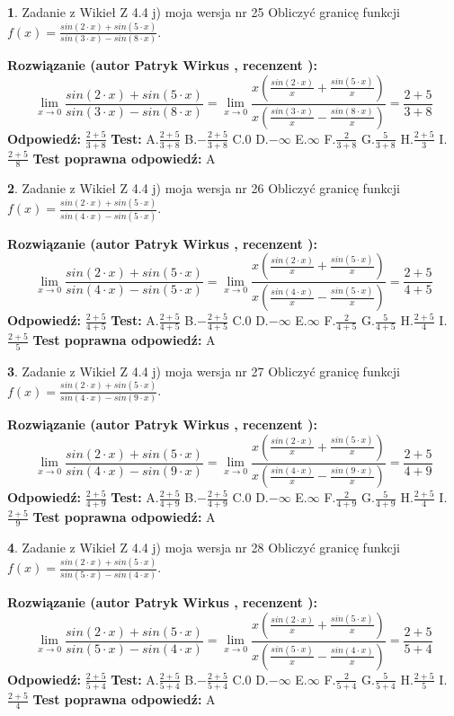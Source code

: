 \documentclass[12pt, a4paper]{article}
\theoremstyle{definition} %
\newtheorem{zad}{}
\newcommand{\zadStart}[1]{\begin{zad}#1\newline}
\newcommand{\zadStop}{\end{zad}}
\newcommand{\rozwStart}[2]{\noindent \textbf{Rozwiązanie (autor #1 , recenzent #2): }\newline}
\newcommand{\rozwStop}{\newline}
\newcommand{\odpStart}{\noindent \textbf{Odpowiedź:}\newline}
\newcommand{\odpStop}{\newline}
\newcommand{\testStart}{\noindent \textbf{Test:}\newline}
\newcommand{\testStop}{\newline}
\newcommand{\kluczStart}{\noindent \textbf{Test poprawna odpowiedź:}\newline}
\newcommand{\kluczStop}{\newline}
\begin{document}
\zadStart{Zadanie z Wikieł Z 4.4 j) moja wersja nr 25}
Obliczyć granicę funkcji $f(x)=\frac{sin(2\cdot x) +sin(5\cdot x)}{sin(3\cdot x) -sin(8\cdot x)}$.
\zadStop
\rozwStart{Patryk Wirkus}{}
$$\lim\limits_{x\to 0}\frac{sin(2\cdot x) +sin(5\cdot x)}{sin(3\cdot x) -sin(8\cdot x)}=\lim\limits_{x\to 0}\frac{x(\frac{sin(2\cdot x)}{x}+\frac{sin(5\cdot x)}{x})}{x(\frac{sin(3\cdot x)}{x}-\frac{sin(8\cdot x)}{x})}=\frac{2+5}{3+8}$$
\rozwStop
\odpStart
$\frac{2+5}{3+8}$
\odpStop
\testStart
A.$\frac{2+5}{3+8}$
B.$-\frac{2+5}{3+8}$
C.$0$
D.$-\infty$
E.$\infty$
F.$\frac{2}{3+8}$
G.$\frac{5}{3+8}$
H.$\frac{2+5}{3}$
I.$\frac{2+5}{8}$
\testStop
\kluczStart
A
\kluczStop



\zadStart{Zadanie z Wikieł Z 4.4 j) moja wersja nr 26}
Obliczyć granicę funkcji $f(x)=\frac{sin(2\cdot x) +sin(5\cdot x)}{sin(4\cdot x) -sin(5\cdot x)}$.
\zadStop
\rozwStart{Patryk Wirkus}{}
$$\lim\limits_{x\to 0}\frac{sin(2\cdot x) +sin(5\cdot x)}{sin(4\cdot x) -sin(5\cdot x)}=\lim\limits_{x\to 0}\frac{x(\frac{sin(2\cdot x)}{x}+\frac{sin(5\cdot x)}{x})}{x(\frac{sin(4\cdot x)}{x}-\frac{sin(5\cdot x)}{x})}=\frac{2+5}{4+5}$$
\rozwStop
\odpStart
$\frac{2+5}{4+5}$
\odpStop
\testStart
A.$\frac{2+5}{4+5}$
B.$-\frac{2+5}{4+5}$
C.$0$
D.$-\infty$
E.$\infty$
F.$\frac{2}{4+5}$
G.$\frac{5}{4+5}$
H.$\frac{2+5}{4}$
I.$\frac{2+5}{5}$
\testStop
\kluczStart
A
\kluczStop



\zadStart{Zadanie z Wikieł Z 4.4 j) moja wersja nr 27}
Obliczyć granicę funkcji $f(x)=\frac{sin(2\cdot x) +sin(5\cdot x)}{sin(4\cdot x) -sin(9\cdot x)}$.
\zadStop
\rozwStart{Patryk Wirkus}{}
$$\lim\limits_{x\to 0}\frac{sin(2\cdot x) +sin(5\cdot x)}{sin(4\cdot x) -sin(9\cdot x)}=\lim\limits_{x\to 0}\frac{x(\frac{sin(2\cdot x)}{x}+\frac{sin(5\cdot x)}{x})}{x(\frac{sin(4\cdot x)}{x}-\frac{sin(9\cdot x)}{x})}=\frac{2+5}{4+9}$$
\rozwStop
\odpStart
$\frac{2+5}{4+9}$
\odpStop
\testStart
A.$\frac{2+5}{4+9}$
B.$-\frac{2+5}{4+9}$
C.$0$
D.$-\infty$
E.$\infty$
F.$\frac{2}{4+9}$
G.$\frac{5}{4+9}$
H.$\frac{2+5}{4}$
I.$\frac{2+5}{9}$
\testStop
\kluczStart
A
\kluczStop



\zadStart{Zadanie z Wikieł Z 4.4 j) moja wersja nr 28}
Obliczyć granicę funkcji $f(x)=\frac{sin(2\cdot x) +sin(5\cdot x)}{sin(5\cdot x) -sin(4\cdot x)}$.
\zadStop
\rozwStart{Patryk Wirkus}{}
$$\lim\limits_{x\to 0}\frac{sin(2\cdot x) +sin(5\cdot x)}{sin(5\cdot x) -sin(4\cdot x)}=\lim\limits_{x\to 0}\frac{x(\frac{sin(2\cdot x)}{x}+\frac{sin(5\cdot x)}{x})}{x(\frac{sin(5\cdot x)}{x}-\frac{sin(4\cdot x)}{x})}=\frac{2+5}{5+4}$$
\rozwStop
\odpStart
$\frac{2+5}{5+4}$
\odpStop
\testStart
A.$\frac{2+5}{5+4}$
B.$-\frac{2+5}{5+4}$
C.$0$
D.$-\infty$
E.$\infty$
F.$\frac{2}{5+4}$
G.$\frac{5}{5+4}$
H.$\frac{2+5}{5}$
I.$\frac{2+5}{4}$
\testStop
\kluczStart
A
\kluczStop
\end{document}
